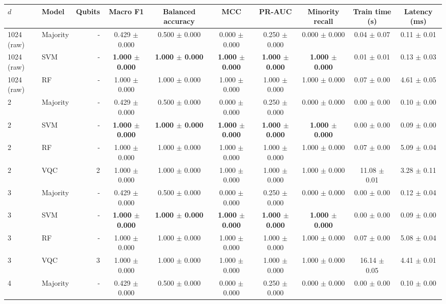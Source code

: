 \begin{tabular}{llrccccccc}
\toprule
$d$ & Model & Qubits & Macro F1 & Balanced accuracy & MCC & PR-AUC & Minority recall & Train time (s) & Latency (ms) \\
\midrule
1024 (raw) & Majority & - & 0.429 $\pm$ 0.000 & 0.500 $\pm$ 0.000 & 0.000 $\pm$ 0.000 & 0.250 $\pm$ 0.000 & 0.000 $\pm$ 0.000 & 0.04 $\pm$ 0.07 & 0.11 $\pm$ 0.01 \\
1024 (raw) & SVM & - & \textbf{1.000 $\pm$ 0.000} & \textbf{1.000 $\pm$ 0.000} & \textbf{1.000 $\pm$ 0.000} & \textbf{1.000 $\pm$ 0.000} & \textbf{1.000 $\pm$ 0.000} & 0.01 $\pm$ 0.01 & 0.13 $\pm$ 0.03 \\
1024 (raw) & RF & - & 1.000 $\pm$ 0.000 & 1.000 $\pm$ 0.000 & 1.000 $\pm$ 0.000 & 1.000 $\pm$ 0.000 & 1.000 $\pm$ 0.000 & 0.07 $\pm$ 0.00 & 4.61 $\pm$ 0.05 \\
\midrule
2 & Majority & - & 0.429 $\pm$ 0.000 & 0.500 $\pm$ 0.000 & 0.000 $\pm$ 0.000 & 0.250 $\pm$ 0.000 & 0.000 $\pm$ 0.000 & 0.00 $\pm$ 0.00 & 0.10 $\pm$ 0.00 \\
2 & SVM & - & \textbf{1.000 $\pm$ 0.000} & \textbf{1.000 $\pm$ 0.000} & \textbf{1.000 $\pm$ 0.000} & \textbf{1.000 $\pm$ 0.000} & \textbf{1.000 $\pm$ 0.000} & 0.00 $\pm$ 0.00 & 0.09 $\pm$ 0.00 \\
2 & RF & - & 1.000 $\pm$ 0.000 & 1.000 $\pm$ 0.000 & 1.000 $\pm$ 0.000 & 1.000 $\pm$ 0.000 & 1.000 $\pm$ 0.000 & 0.07 $\pm$ 0.00 & 5.09 $\pm$ 0.04 \\
2 & VQC & 2 & 1.000 $\pm$ 0.000 & 1.000 $\pm$ 0.000 & 1.000 $\pm$ 0.000 & 1.000 $\pm$ 0.000 & 1.000 $\pm$ 0.000 & 11.08 $\pm$ 0.01 & 3.28 $\pm$ 0.11 \\
\midrule
3 & Majority & - & 0.429 $\pm$ 0.000 & 0.500 $\pm$ 0.000 & 0.000 $\pm$ 0.000 & 0.250 $\pm$ 0.000 & 0.000 $\pm$ 0.000 & 0.00 $\pm$ 0.00 & 0.12 $\pm$ 0.04 \\
3 & SVM & - & \textbf{1.000 $\pm$ 0.000} & \textbf{1.000 $\pm$ 0.000} & \textbf{1.000 $\pm$ 0.000} & \textbf{1.000 $\pm$ 0.000} & \textbf{1.000 $\pm$ 0.000} & 0.00 $\pm$ 0.00 & 0.09 $\pm$ 0.00 \\
3 & RF & - & 1.000 $\pm$ 0.000 & 1.000 $\pm$ 0.000 & 1.000 $\pm$ 0.000 & 1.000 $\pm$ 0.000 & 1.000 $\pm$ 0.000 & 0.07 $\pm$ 0.00 & 5.08 $\pm$ 0.04 \\
3 & VQC & 3 & 1.000 $\pm$ 0.000 & 1.000 $\pm$ 0.000 & 1.000 $\pm$ 0.000 & 1.000 $\pm$ 0.000 & 1.000 $\pm$ 0.000 & 16.14 $\pm$ 0.05 & 4.41 $\pm$ 0.01 \\
\midrule
4 & Majority & - & 0.429 $\pm$ 0.000 & 0.500 $\pm$ 0.000 & 0.000 $\pm$ 0.000 & 0.250 $\pm$ 0.000 & 0.000 $\pm$ 0.000 & 0.00 $\pm$ 0.00 & 0.10 $\pm$ 0.00 \\

\end{tabular}
